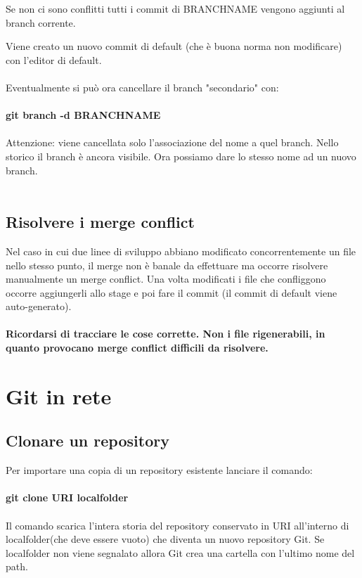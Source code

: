 \documentclass[a4paper,12pt]{report}
\begin{document}
Se non ci sono conflitti tutti i commit di BRANCHNAME vengono aggiunti al branch corrente.

Viene creato un nuovo commit di default (che è buona norma non modificare) con l'editor di default.
\\\\
Eventualmente si può ora cancellare il branch "secondario" con:
\\\\
\textbf{git branch -d BRANCHNAME}
\\\\
Attenzione: viene cancellata solo l'associazione del nome a quel branch. Nello storico il branch è ancora visibile. Ora possiamo dare lo stesso nome ad un nuovo branch.
\\\\
\section{Risolvere i merge conflict}
Nel caso in cui due linee di sviluppo abbiano modificato concorrentemente un file nello stesso punto, il merge non è banale da effettuare ma occorre risolvere manualmente un merge conflict.
Una volta modificati i file che confliggono occorre aggiungerli allo stage e poi fare il commit (il commit di default viene auto-generato).
\\\\
\textbf{Ricordarsi di tracciare le cose corrette. Non i file rigenerabili, in quanto provocano merge conflict difficili da risolvere.}


\chapter{Git in rete}

\section{Clonare un repository}
Per importare una copia di un repository esistente lanciare il comando:
\\\\
\textbf{git clone URI localfolder}
\\\\
Il comando scarica l'intera storia del repository conservato in URI all'interno di localfolder(che deve essere vuoto) che diventa un nuovo repository Git. Se localfolder non viene segnalato allora Git crea una cartella con l'ultimo nome del path.
\end{document}

